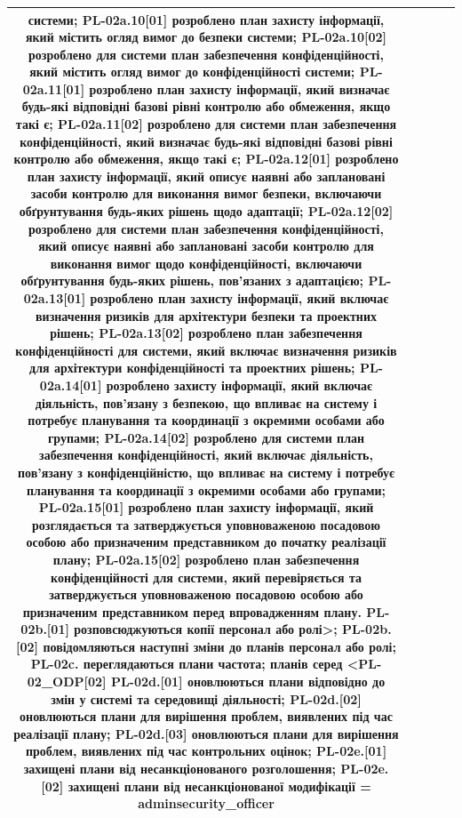 \documentclass[10pt]{article}
\begin{document}
\begin{longtable}{|c|>{\raggedright\arraybackslash}p{2.5cm}|>{\raggedright\arraybackslash}p{4.5cm}|c|>{\raggedright\arraybackslash}p{4.5cm}|}
системи; PL-02a.10[01] розроблено план захисту інформації, який містить огляд вимог до безпеки системи; PL-02a.10[02] розроблено для системи план забезпечення конфіденційності, який містить огляд вимог до конфіденційності системи; PL-02a.11[01] розроблено план захисту інформації, який визначає будь-які відповідні базові рівні контролю або обмеження, якщо такі є; PL-02a.11[02] розроблено для системи план забезпечення конфіденційності, який визначає будь-які відповідні базові рівні контролю або обмеження, якщо такі є; PL-02a.12[01] розроблено план захисту інформації, який описує наявні або заплановані засоби контролю для виконання вимог безпеки, включаючи обґрунтування будь-яких рішень щодо адаптації; PL-02a.12[02] розроблено для системи план забезпечення конфіденційності, який описує наявні або заплановані засоби контролю для виконання вимог щодо конфіденційності, включаючи обґрунтування будь-яких рішень, пов'язаних з адаптацією; PL-02a.13[01] розроблено план захисту інформації, який включає визначення ризиків для архітектури безпеки та проектних рішень; PL-02a.13[02] розроблено план забезпечення конфіденційності для системи, який включає визначення ризиків для архітектури конфіденційності та проектних рішень; PL-02a.14[01] розроблено захисту інформації, який включає діяльність, пов'язану з безпекою, що впливає на систему і потребує планування та координації з окремими особами або групами; PL-02a.14[02] розроблено для системи план забезпечення конфіденційності, який включає діяльність, пов'язану з конфіденційністю, що впливає на систему і потребує планування та координації з окремими особами або групами; PL-02a.15[01] розроблено план захисту інформації, який розглядається та затверджується уповноваженою посадовою особою або призначеним представником до початку реалізації плану; PL-02a.15[02] розроблено план забезпечення конфіденційності для системи, який перевіряється та затверджується уповноваженою посадовою особою або призначеним представником перед впровадженням плану. PL-02b.[01] розповсюджуються копії персонал або ролі>; PL-02b.[02] повідомляються наступні зміни до планів персонал або ролі; PL-02c. переглядаються плани частота; планів серед <PL-02\_\allowbreak{}ODP[02] PL-02d.[01] оновлюються плани відповідно до змін у системі та середовищі діяльності; PL-02d.[02] оновлюються плани для вирішення проблем, виявлених під час реалізації плану; PL-02d.[03] оновлюються плани для вирішення проблем, виявлених під час контрольних оцінок; PL-02e.[01] захищені плани від несанкціонованого розголошення; PL-02e.[02] захищені плани від несанкціонованої модифікації = \textbf{adminsecurity\_\allowbreak{}officer} \\ \hline

\end{longtable}
\end{document}
